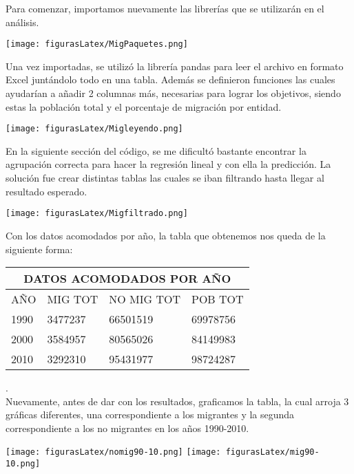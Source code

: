 \documentclass[12pt]{article}
\begin{document}
Para comenzar, importamos nuevamente las librerías que se utilizarán en el análisis.

\begin{center}
\texttt{[image: figurasLatex/MigPaquetes.png]}\label{fig3.1} 
\end{center}

Una vez importadas, se utilizó la librería pandas para leer el archivo en formato Excel juntándolo todo en una tabla. Además se definieron funciones las cuales ayudarían a añadir 2 columnas más, necesarias para lograr los objetivos, siendo estas la población total y el porcentaje de migración por entidad.

\begin{center}
\texttt{[image: figurasLatex/Migleyendo.png]}\label{fig3.2} 
\end{center}

En la siguiente sección del código, se me dificultó bastante encontrar la agrupación correcta para hacer la regresión lineal y con ella la predicción. La solución fue crear distintas tablas las cuales se iban filtrando hasta llegar al resultado esperado.

\begin{center}
\texttt{[image: figurasLatex/Migfiltrado.png]}\label{fig3.3}
\end{center}

Con los datos acomodados por año, la tabla que obtenemos nos queda de la siguiente forma:\\

\begin{tabular}{ |p{3cm}||p{3cm}|p{3cm}|p{3cm}|  }
 \hline
 \multicolumn{4}{|c|}{DATOS ACOMODADOS POR AÑO} \\
 \hline
 AÑO & MIG TOT & NO MIG TOT & POB TOT\\
 \hline
 1990 & 3477237   & 66501519 & 69978756   \\
 2000 & 3584957   & 80565026 & 84149983\\
 2010 & 3292310   & 95431977 & 98724287\\
 \hline
\end{tabular} \label{tab3.1}.\\


Nuevamente, antes de dar con los resultados, graficamos la tabla, la cual arroja 3 gráficas diferentes, una correspondiente a los migrantes y la segunda correspondiente a los no migrantes en los años 1990-2010.

\begin{center}
\texttt{[image: figurasLatex/nomig90-10.png]} 
\texttt{[image: figurasLatex/mig90-10.png]} 
\end{center}\label{fig3.4}
\end{document}
